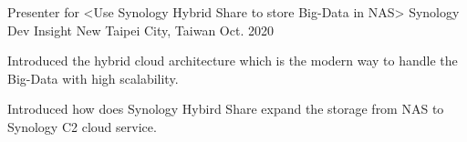 

\begin{cventries}

  \cventry
    {Presenter for <Use Synology Hybrid Share to store Big-Data in NAS>} %
    {Synology Dev Insight} %
    {New Taipei City, Taiwan} %
    {Oct. 2020} %
    {
      \begin{cvitems} %
        \item {Introduced the hybrid cloud architecture which is the modern way to handle the Big-Data with high scalability.}
        \item {Introduced how does Synology Hybird Share expand the storage from NAS to Synology C2 cloud service.}
      \end{cvitems}
    }
\end{cventries}
